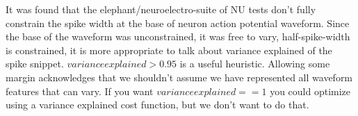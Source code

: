 It was found that the elephant/neuroelectro-suite of NU tests don't fully constrain the spike width at the base of neuron action potential waveform. Since the base of the waveform was unconstrained, it was free to vary, half-spike-width is constrained, it is more appropriate to talk about variance explained of the spike snippet. $variance explained>0.95$ is a useful heuristic. Allowing some margin acknowledges that we shouldn't assume we have represented all waveform features that can vary. If you want $variance explained==1$   
you could optimize using a variance explained 
cost function, but we don't want to do that.